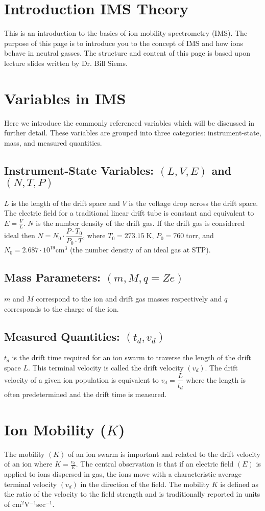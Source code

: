\documentclass[10pt,a4paper,final]{article}
\begin{document}
\section{Introduction IMS Theory}
This is an introduction to the basics of ion mobility spectrometry (IMS). The purpose of this page is to introduce you to the concept of IMS and how ions behave in neutral gasses. The structure and content of this page is based upon lecture slides written by Dr. Bill Siems.
\section{Variables in IMS}
Here we introduce the commonly referenced variables which will be discussed in further detail. These variables are grouped into three categories: instrument-state, mass, and measured quantities.
\subsection{Instrument-State Variables: $(L, V, E)$ and $(N, T, P)$}
$L$ is the length of the drift space and $V$ is the voltage drop across the drift space. The electric field for a traditional linear drift tube is constant and equivalent to $E=\frac{V}{L}$. $N$ is the number density of the drift gas. If the drift gas is considered ideal then $N=N_0\cdot \dfrac{P\cdot T_0}{P_0\cdot T}$, where $T_0=273.15\;$K, $P_0= 760\;$torr, and  $N_0=2.687\cdot10^{19} \text{cm}^3$ (the number density of an ideal gas at STP).
\subsection{Mass Parameters: $(m, M, q=Ze)$}
$m$ and $M$ correspond to the ion and drift gas masses respectively and $q$ corresponds to the charge of the ion.
\subsection{Measured Quantities: $(t_d, v_d)$}
$t_d$ is the drift time required for an ion swarm to traverse the length of the drift space $L$. This terminal velocity is called the drift velocity $(v_d)$. The drift velocity of a given ion population is equivalent to $v_d=\dfrac{L}{t_d}$ where the length is often predetermined and the drift time is measured.
\section{Ion Mobility ($K$)}
The mobility $(K)$ of an ion swarm is important and related to the drift velocity of an ion where $K=\frac{v_d}{E}$.
The central observation is that if an electric field $(E)$ is applied to ions dispersed in gas, the ions move with a characteristic average terminal velocity $(v_d)$ in the direction of the field. The mobility $K$ is defined as the ratio of the velocity to the field strength and is traditionally reported in units of cm$^2$V$^{-1}$sec$^{-1}$.
\end{document}
